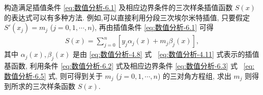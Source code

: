\documentclass[../../main.tex]{subfiles}
\begin{document}
\vspace{0.5cm}

构造满足插值条件 \eqref{eq:数值分析-6.1} 及相应边界条件的三次样条插值函数 $S(x)$ 的表达式可以有多种方法. 例如,可以直接利用分段三次埃尔米特插值, 只要假定 $S'(x_j) = m_j$ ($j = 0, 1, \cdots, n$), 再由插值条件 \eqref{eq:数值分析-6.1} 可得
\begin{align}
S(x) = \sum_{j=0}^n [ y_j \alpha_j(x) + m_j \beta_j(x) ], \label{eq:数值分析-6.6}
\end{align}
其中 $\alpha_j(x), \beta_j(x)$ 是由 \eqref{eq:数值分析-4.8} 式~ \eqref{eq:数值分析-4.11} 式表示的插值基函数, 利用条件 \eqref{eq:数值分析-6.2} 式及相应边界条件 \eqref{eq:数值分析-6.3} 式~ \eqref{eq:数值分析-6.5} 式, 则可得到关于 $m_j$ ($j = 0, 1, \cdots, n$) 的三对角方程组, 求出 $m_j$ 则得到所求的三次样条函数 $S(x)$.
\end{document}
